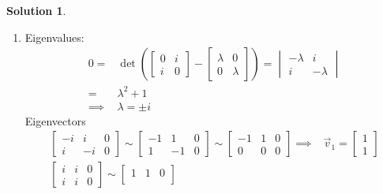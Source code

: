 \documentclass[10pt]{article}
\theoremstyle{definition}
\newtheorem{soln}{Solution}
\begin{document}
\begin{soln}
\begin{enumerate}[label=(\alph*)]
    \item Eigenvalues:
          \begin{align*}
            0 =      & \det(\begin{bmatrix}
                              0 & i \\
                              i & 0
                            \end{bmatrix}
            -
            \begin{bmatrix}
              \lambda & 0       \\
              0       & \lambda
            \end{bmatrix})
            =
            \begin{vmatrix}
              -\lambda & i        \\
              i        & -\lambda
            \end{vmatrix}            \\
            =        & \lambda^2+1         \\
            \implies & \lambda=\pm i
          \end{align*}
          Eigenvectors
          \begin{align*}
            \begin{bmatrix}
              -i & i  & 0 \\
              i  & -i & 0
            \end{bmatrix}\sim
            \begin{bmatrix}
              -1 & 1  & 0 \\
              1  & -1 & 0
            \end{bmatrix}\sim
            \begin{bmatrix}
              -1 & 1 & 0 \\
              0  & 0 & 0
            \end{bmatrix}
            \implies & \vec{v}_1=\begin{bmatrix}
                                   1 \\
                                   1
                                 \end{bmatrix} \\
            \begin{bmatrix}
              i & i & 0 \\
              i & i & 0
            \end{bmatrix}\sim
            \begin{bmatrix}
              1 & 1 & 0 \\

\end{bmatrix}
\end{align*}
\end{enumerate}
\end{soln}
\end{document}
